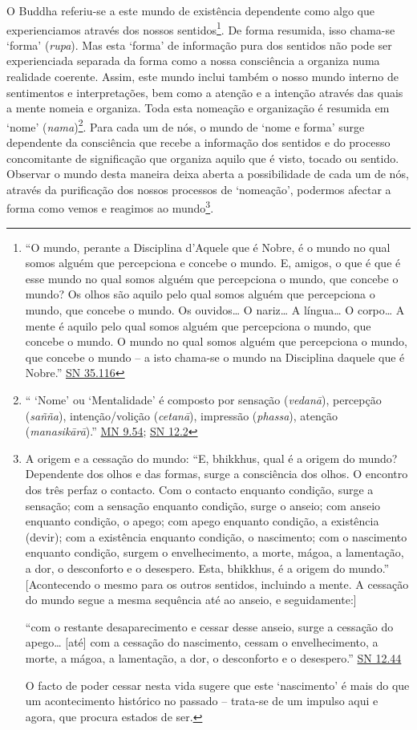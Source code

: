 O Buddha referiu-se a este mundo de existência dependente como algo que experienciamos através dos nossos sentidos\footnote{``O mundo, perante a Disciplina d'Aquele que é Nobre, é o mundo no qual somos alguém que percepciona e concebe o mundo. E, amigos, o que é que é esse mundo no qual somos alguém que percepciona o mundo, que concebe o mundo? Os olhos são aquilo pelo qual somos alguém que percepciona o mundo, que concebe o mundo. Os ouvidos\ldots{} O nariz\ldots{} A língua\ldots{} O corpo\ldots{} A mente é aquilo pelo qual somos alguém que percepciona o mundo, que concebe o mundo. O mundo no qual somos alguém que percepciona o mundo, que concebe o mundo -- a isto chama-se o mundo na Disciplina daquele que é Nobre.'' \href{https://suttacentral.net/sn35.116/en/bodhi}{SN 35.116}}. De forma resumida, isso chama-se `forma' (\emph{rupa}). Mas esta `forma' de informação pura dos sentidos não pode ser experienciada separada da forma como a nossa consciência a organiza numa realidade coerente. Assim, este mundo inclui também o nosso mundo interno de sentimentos e interpretações, bem como a atenção e a intenção através das quais a mente nomeia e organiza. Toda esta nomeação e organização é resumida em `nome' (\emph{nama})\footnote{`` `Nome' ou `Mentalidade' é composto por sensação (\emph{vedanā}), percepção (\emph{sañña}), intenção/volição (\emph{cetanā}), impressão (\emph{phassa}), atenção (\emph{manasikārā}).'' \href{https://suttacentral.net/mn9/en/bodhi}{MN 9.54}; \href{https://suttacentral.net/sn12.2/en/bodhi}{SN 12.2}}. Para cada um de nós, o mundo de `nome e forma' surge dependente da consciência que recebe a informação dos sentidos e do processo concomitante de significação que organiza aquilo que é visto, tocado ou sentido. Observar o mundo desta maneira deixa aberta a possibilidade de cada um de nós, através da purificação dos nossos processos de `nomeação', podermos afectar a forma como vemos e reagimos ao mundo\footnote{A origem e a cessação do mundo: ``E, bhikkhus, qual é a origem do mundo? Dependente dos olhos e das formas, surge a consciência dos olhos. O encontro dos três perfaz o contacto. Com o contacto enquanto condição, surge a sensação; com a sensação enquanto condição, surge o anseio; com anseio enquanto condição, o apego; com apego enquanto condição, a existência (devir); com a existência enquanto condição, o nascimento; com o nascimento enquanto condição, surgem o envelhecimento, a morte, mágoa, a lamentação, a dor, o desconforto e o desespero. Esta, bhikkhus, é a origem do mundo.'' {[}Acontecendo o mesmo para os outros sentidos, incluindo a mente. A cessação do mundo segue a mesma sequência até ao anseio, e seguidamente:{]}

  ``com o restante desaparecimento e cessar desse anseio, surge a cessação do apego\ldots{} {[}até{]} com a cessação do nascimento, cessam o envelhecimento, a morte, a mágoa, a lamentação, a dor, o desconforto e o desespero.'' \href{https://suttacentral.net/sn12.44/en/bodhi}{SN 12.44}

  O facto de poder cessar nesta vida sugere que este `nascimento' é mais do que um acontecimento histórico no passado -- trata-se de um impulso aqui e agora, que procura estados de ser.}.


